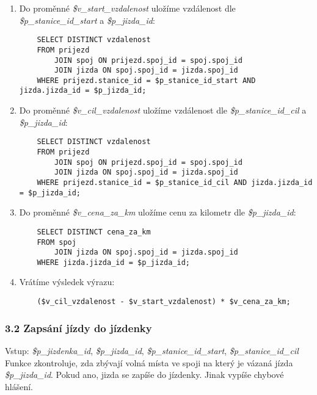 \documentclass[11pt]{article}
\begin{document}
\begin{enumerate}
    \item Do proměnné \textit{\$v\_start\_vzdalenost} uložíme vzdálenost dle \textit{\$p\_stanice\_id\_start} a \textit{\$p\_jizda\_id}:
    \begin{lstlisting}
    SELECT DISTINCT vzdalenost
    FROM prijezd
        JOIN spoj ON prijezd.spoj_id = spoj.spoj_id
        JOIN jizda ON spoj.spoj_id = jizda.spoj_id
    WHERE prijezd.stanice_id = $p_stanice_id_start AND jizda.jizda_id = $p_jizda_id;
    \end{lstlisting}
    
    \item Do proměnné \textit{\$v\_cil\_vzdalenost} uložíme vzdálenost dle \textit{\$p\_stanice\_id\_cil} a \textit{\$p\_jizda\_id}:
    \begin{lstlisting}
    SELECT DISTINCT vzdalenost
    FROM prijezd
        JOIN spoj ON prijezd.spoj_id = spoj.spoj_id
        JOIN jizda ON spoj.spoj_id = jizda.spoj_id
    WHERE prijezd.stanice_id = $p_stanice_id_cil AND jizda.jizda_id = $p_jizda_id;
    \end{lstlisting}

    \item Do proměnné \textit{\$v\_cena\_za\_km} uložíme cenu za kilometr dle \textit{\$p\_jizda\_id}:
    \begin{lstlisting}
    SELECT DISTINCT cena_za_km
    FROM spoj
        JOIN jizda ON spoj.spoj_id = jizda.spoj_id
    WHERE jizda.jizda_id = $p_jizda_id;
    \end{lstlisting}

    \item Vrátíme výsledek výrazu:
    \begin{lstlisting}
    ($v_cil_vzdalenost - $v_start_vzdalenost) * $v_cena_za_km;
    \end{lstlisting}
\end{enumerate}


\subsubsection*{3.2	Zapsání jízdy do jízdenky}
Vstup: \textit{\$p\_jizdenka\_id}, \textit{\$p\_jizda\_id}, \textit{\$p\_stanice\_id\_start}, \textit{\$p\_stanice\_id\_cil}\\
Funkce zkontroluje, zda zbývají volná místa ve spoji na který je vázaná jízda \textit{\$p\_jizda\_id}. Pokud ano, jizda se zapíše do jízdenky. Jinak vypíše chybové hlášení.
\end{document}
